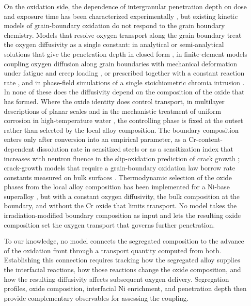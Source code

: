 \documentclass[12pt]{article}
\begin{document}
On the oxidation side, the dependence of intergranular penetration depth
on dose and exposure time has been characterized
experimentally \parencite{deng2017effect,deng2020corrosion}, but existing
kinetic models of grain-boundary oxidation do not respond to the grain boundary
chemistry. Models that resolve oxygen transport along the grain boundary treat
the oxygen diffusivity as a single constant: in analytical or
semi-analytical solutions that give the penetration depth in closed form
\parencite{fisher1951calculation,xu2015modeling,evans2013mechanism}, in
finite-element models coupling oxygen diffusion along grain boundaries with
mechanical deformation under fatigue and creep loading
\parencite{zhao2011modeling,karabela2013oxygen}, or prescribed together with
a constant reaction rate \parencite{aoyagi2012crystal}, and in phase-field simulations of a single
stoichiometric chromia intrusion
\parencite{derancourt2015modelling,rancourt2025viscoplasticity}. In none of
these does the diffusivity depend on the composition of the oxide that has
formed. Where the oxide identity does control transport, in multilayer
descriptions of planar scales \parencite{harrison1984ratios,huang2022multilayer}
and in the mechanistic treatment of uniform corrosion in high-temperature
water \parencite{robertson1991mechanism}, the controlling phase is fixed at
the outset rather than selected by the local alloy composition. The
boundary composition enters only after conversion into an empirical
parameter, as a Cr-content-dependent dissolution rate in sensitized steels
\parencite{osawa1985computer} or as a sensitization index that increases
with neutron fluence in the slip-oxidation prediction of crack growth
\parencite{ford1996quantitative}; crack-growth models that require a
grain-boundary oxidation law borrow rate constants measured on bulk
surfaces \parencite{shoji2010formulating}. Thermodynamic selection of the
oxide phases from the local alloy composition has been implemented for a
Ni-base superalloy \parencite{fang2022numerical}, but with a constant
oxygen diffusivity, the bulk composition at the boundary, and without the
Cr oxide that limits transport. No model takes the irradiation-modified
boundary composition as input and lets the resulting oxide composition set
the oxygen transport that governs further penetration.

To our knowledge, no model connects the segregated composition to the
advance of the oxidation front through a transport quantity computed from
both. Establishing this connection requires tracking how the segregated
alloy supplies the interfacial reactions, how those reactions change the
oxide composition, and how the resulting diffusivity affects subsequent oxygen
delivery. Segregation profiles, oxide composition, interfacial Ni
enrichment, and penetration depth then provide complementary observables
for assessing the coupling.
\end{document}
